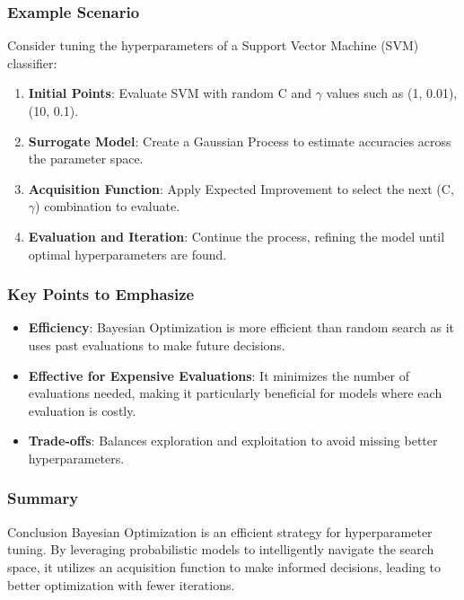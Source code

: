 \documentclass[aspectratio=169]{beamer}
\begin{document}
\begin{frame}[fragile]
    \frametitle{Example Scenario}
    Consider tuning the hyperparameters of a Support Vector Machine (SVM) classifier: 
    \begin{enumerate}
        \item \textbf{Initial Points}: 
        Evaluate SVM with random C and $\gamma$ values such as (1, 0.01), (10, 0.1).
        
        \item \textbf{Surrogate Model}: 
        Create a Gaussian Process to estimate accuracies across the parameter space.
        
        \item \textbf{Acquisition Function}: 
        Apply Expected Improvement to select the next (C, $\gamma$) combination to evaluate.
        
        \item \textbf{Evaluation and Iteration}: 
        Continue the process, refining the model until optimal hyperparameters are found.
    \end{enumerate}
\end{frame}

\begin{frame}[fragile]
    \frametitle{Key Points to Emphasize}
    \begin{itemize}
        \item \textbf{Efficiency}: 
        Bayesian Optimization is more efficient than random search as it uses past evaluations to make future decisions.
        
        \item \textbf{Effective for Expensive Evaluations}: 
        It minimizes the number of evaluations needed, making it particularly beneficial for models where each evaluation is costly.
        
        \item \textbf{Trade-offs}: 
        Balances exploration and exploitation to avoid missing better hyperparameters.
    \end{itemize}
\end{frame}

\begin{frame}[fragile]
    \frametitle{Summary}
    \begin{block}{Conclusion}
        Bayesian Optimization is an efficient strategy for hyperparameter tuning. By leveraging probabilistic models to intelligently navigate the search space, it utilizes an acquisition function to make informed decisions, leading to better optimization with fewer iterations.
    \end{block}
\end{frame}
\end{document}
